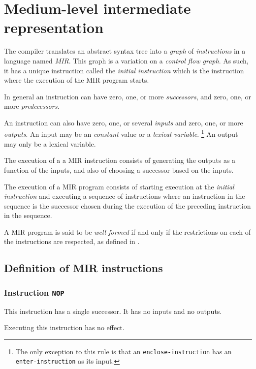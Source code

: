 \chapter{Medium-level intermediate representation}
\label{chap-mir}

The compiler translates an abstract syntax tree into a \emph{graph} of
\emph{instructions} in a language named \emph{MIR}.  This graph is a
variation on a \emph{control flow graph}.  As such, it has a unique
instruction called the \emph{initial instruction} which is the
instruction where the execution of the MIR program starts. 

In general an instruction can have zero, one, or more
\emph{successors}, and zero, one, or more \emph{predecessors}.

An instruction can also have zero, one, or several \emph{inputs} and
zero, one, or more \emph{outputs}.  An input may be an \emph{constant}
value or a \emph{lexical variable}.%
\footnote{The only exception to this rule is that an
  \texttt{enclose-instruction} has an \texttt{enter-instruction} as
  its input.}  An output may only be a lexical variable.

The execution of a a MIR instruction consists of generating the
outputs as a function of the inputs, and also of choosing a successor
based on the inputs.

The execution of a MIR program consists of starting execution at the
\emph{initial instruction} and executing a sequence of instructions
where an instruction in the sequence is the successor chosen during
the execution of the preceding instruction in the sequence.

A MIR program is said to be \emph{well formed} if and only if the
restrictions on each of the instructions are respected, as defined in
.

\section{Definition of MIR instructions}
\label{sec-mir-instructions}

\subsection{Instruction \texttt{NOP}}
\label{mir-instruction-NOP}

This instruction has a single successor.  It has no inputs and no
outputs.

Executing this instruction has no effect. 

